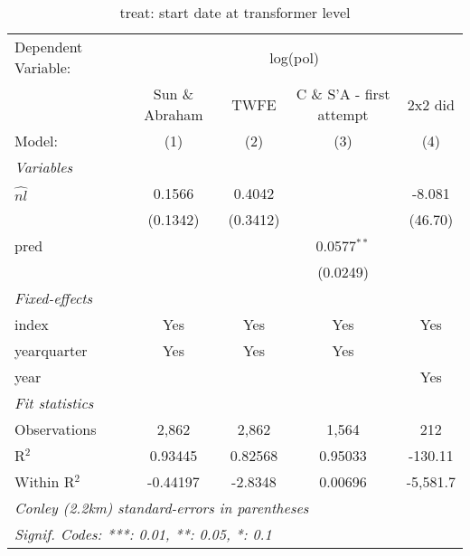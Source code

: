 
\begin{table}[H]
   \caption{treat: start date at transformer level}
   \centering
   \begin{tabular}{lcccc}
      \tabularnewline \midrule \midrule
      Dependent Variable: & \multicolumn{4}{c}{log(pol)}\\
       & Sun \& Abraham & TWFE & C \& S'A - first attempt & 2x2 did \\ 
      Model:          & (1)      & (2)      & (3)           & (4)\\  
      \midrule
      \emph{Variables}\\
      $\widehat{nl}$  & 0.1566   & 0.4042   &               & -8.081\\   
                      & (0.1342) & (0.3412) &               & (46.70)\\   
      pred            &          &          & 0.0577$^{**}$ &   \\   
                      &          &          & (0.0249)      &   \\   
      \midrule
      \emph{Fixed-effects}\\
      index           & Yes      & Yes      & Yes           & Yes\\  
      yearquarter     & Yes      & Yes      & Yes           & \\  
      year            &          &          &               & Yes\\  
      \midrule
      \emph{Fit statistics}\\
      Observations    & 2,862    & 2,862    & 1,564         & 212\\  
      R$^2$           & 0.93445  & 0.82568  & 0.95033       & -130.11\\  
      Within R$^2$    & -0.44197 & -2.8348  & 0.00696       & -5,581.7\\  
      \midrule \midrule
      \multicolumn{5}{l}{\emph{Conley (2.2km) standard-errors in parentheses}}\\
      \multicolumn{5}{l}{\emph{Signif. Codes: ***: 0.01, **: 0.05, *: 0.1}}\\
   \end{tabular}
\end{table}



